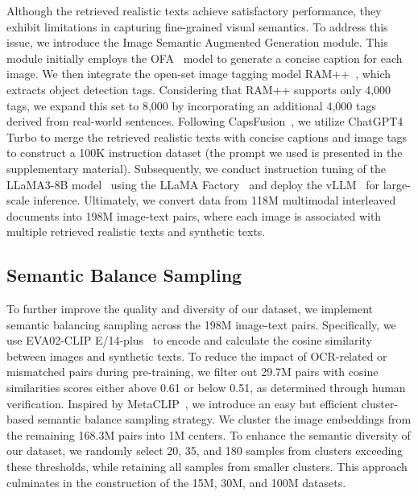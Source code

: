  Although the retrieved realistic texts achieve satisfactory performance, they exhibit limitations in capturing fine-grained visual semantics. To address this issue, we introduce the Image Semantic Augmented Generation module. This module initially employs the OFA~\cite{OFA} model to generate a concise caption for each image. We then integrate the open-set image tagging model RAM++~\cite{RAM_plus_plus}, which extracts object detection tags. Considering that RAM++ supports only 4,000 tags, we expand this set to 8,000 by incorporating an additional 4,000 tags derived from real-world sentences. Following CapsFusion~\cite{yu2024capsfusion}, we utilize ChatGPT4 Turbo to merge the retrieved realistic texts with concise captions and image tags to construct a 100K instruction dataset (the prompt we used is presented in the supplementary material). Subsequently, we conduct instruction tuning of the LLaMA3-8B model~\cite{llama3} using the LLaMA Factory~\cite{llamafactory} and deploy the vLLM~\cite{vLLM} for large-scale inference. Ultimately, we convert data from 118M multimodal interleaved documents into 198M image-text pairs, where each image is associated with multiple retrieved realistic texts and synthetic texts.




\subsection{Semantic Balance Sampling}
To further improve the quality and diversity of our dataset, we implement semantic balancing sampling across the 198M image-text pairs. Specifically, we use EVA02-CLIP E/14-plus~\cite{eva_clip} to encode and calculate the cosine similarity between images and synthetic texts. To reduce the impact of OCR-related or mismatched pairs during pre-training, we filter out 29.7M pairs with cosine similarities scores either above 0.61 or below 0.51, as determined through human verification. Inspired by MetaCLIP~\cite{xu2023metaclip}, we introduce an easy but efficient cluster-based semantic balance sampling strategy. We cluster the image embeddings from the remaining 168.3M pairs into 1M centers. To enhance the semantic diversity of our dataset, we randomly select 20, 35, and 180 samples from clusters exceeding these thresholds, while retaining all samples from smaller clusters.  This approach culminates in the construction of the \dsname15M, \dsname30M, and \dsname100M datasets.





